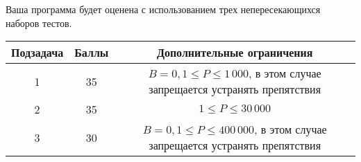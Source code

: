 Ваша программа будет оценена с использованием трех непересекающихся наборов тестов. 
\begin{center}
\renewcommand{\arraystretch}{1.3}
\begin{tabular}{|c|c|c|}
\hline
\textbf{Подзадача} & 
\textbf{Баллы} & 
\textbf{Дополнительные ограничения}
\\ \hline
1 & 35 & $B = 0, 1 \le P \le 1\,000$, в этом случае запрещается устранять
препятствия \\ \hline
2 & 35 & $1 \le P \le 30\,000$ \\ \hline
3 & 30 & $B = 0, 1 \le P \le 400\,000$, в этом случае запрещается устранять
препятствия \\ \hline
\end{tabular}
\end{center}